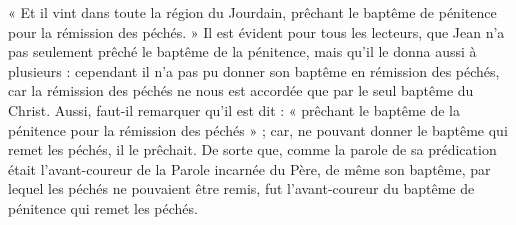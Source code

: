 « Et il vint dans toute la région du Jourdain, prêchant le baptême de pénitence pour la rémission des péchés. » Il est évident pour tous les lecteurs, que Jean n’a pas seulement prêché le baptême de la pénitence, mais qu’il le donna aussi à plusieurs : cependant il n’a pas pu donner son baptême en rémission des péchés, car la rémission des péchés ne nous est accordée que par le seul baptême du Christ. Aussi, faut-il remarquer qu’il est dit : « prêchant le baptême de la pénitence pour la rémission des péchés » ; car, ne pouvant donner le baptême qui remet les péchés, il le prêchait. De sorte que, comme la parole de sa prédication était l’avant-coureur de la Parole incarnée du Père, de même son baptême, par lequel les péchés ne pouvaient être remis, fut l’avant-coureur du baptême de pénitence qui remet les péchés.
